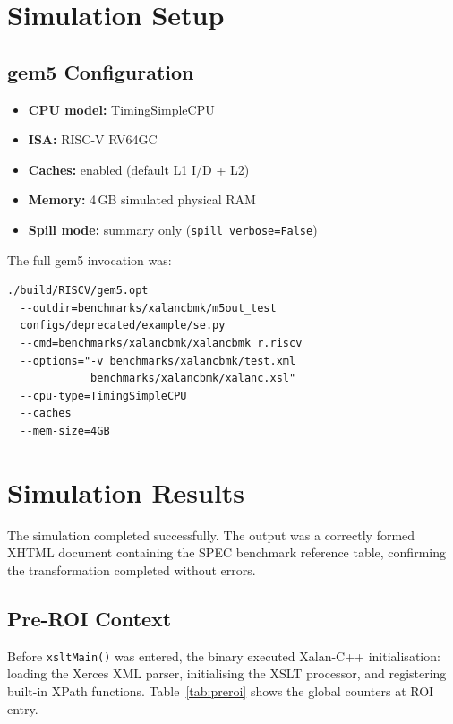 \documentclass[conference]{IEEEtran}
\begin{document}
\section{Simulation Setup}

\subsection{gem5 Configuration}

\begin{itemize}
    \item \textbf{CPU model:}   TimingSimpleCPU
    \item \textbf{ISA:}         RISC-V RV64GC
    \item \textbf{Caches:}      enabled (default L1 I/D + L2)
    \item \textbf{Memory:}      4\,GB simulated physical RAM
    \item \textbf{Spill mode:}  summary only (\texttt{spill\_verbose=False})
\end{itemize}

The full gem5 invocation was:

\begin{verbatim}
./build/RISCV/gem5.opt
  --outdir=benchmarks/xalancbmk/m5out_test
  configs/deprecated/example/se.py
  --cmd=benchmarks/xalancbmk/xalancbmk_r.riscv
  --options="-v benchmarks/xalancbmk/test.xml
             benchmarks/xalancbmk/xalanc.xsl"
  --cpu-type=TimingSimpleCPU
  --caches
  --mem-size=4GB
\end{verbatim}

\section{Simulation Results}

The simulation completed successfully. The output was a correctly
formed XHTML document containing the SPEC benchmark reference table,
confirming the transformation completed without errors.

\subsection{Pre-ROI Context}

Before \texttt{xsltMain()} was entered, the binary executed
Xalan-C++ initialisation: loading the Xerces XML parser, initialising
the XSLT processor, and registering built-in XPath functions.
Table~\ref{tab:preroi} shows the global counters at ROI entry.
\end{document}
